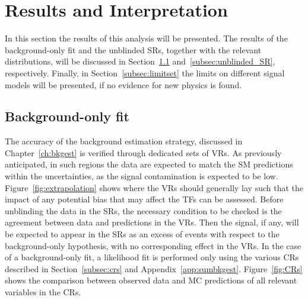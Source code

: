 	\section{Results and Interpretation}
	\label{sec:results}

		In this section the results of this analysis will be presented. The results of the background-only fit and the unblinded \acp{SR}, together with the relevant distributions, will be discussed in Section~\ref{subsec:bkgonly_fit} and~\ref{subsec:unblinded_SR}, respectively. Finally, in Section~\ref{subsec:limitset} the limits on different signal models will be presented, if no evidence for new physics is found.

 		\subsection{Background-only fit}
 		\label{subsec:bkgonly_fit}

 			The accuracy of the background estimation strategy, discussed in Chapter~\ref{ch:bkgest} is verified through dedicated sets of \acp{VR}. As previously anticipated, in such regions the data are expected to match the \ac{SM} predictions within the uncertainties, as the signal contamination is expected to be low. Figure~\ref{fig:extrapolation} shows where the VRs should generally lay such that the impact of any potential bias that may affect the \acp{TF} can be assessed. Before unblinding the data in the \acp{SR}, the necessary condition to be checked is the agreement between data and predictions in the \acp{VR}. Then the signal, if any, will be expected to appear in the \acp{SR} as an excess of events with respect to the background-only hypothesis, with no corresponding effect in the \acp{VR}. In the case of a background-only fit, a likelihood fit is performed only using the various \acp{CR} described in Section~\ref{subsec:crs} and Appendix~\ref{app:sumbkgest}. Figure~\ref{fig:CRs} shows the comparison between observed data and \ac{MC} predictions of all relevant variables in the \acp{CR}.
		
